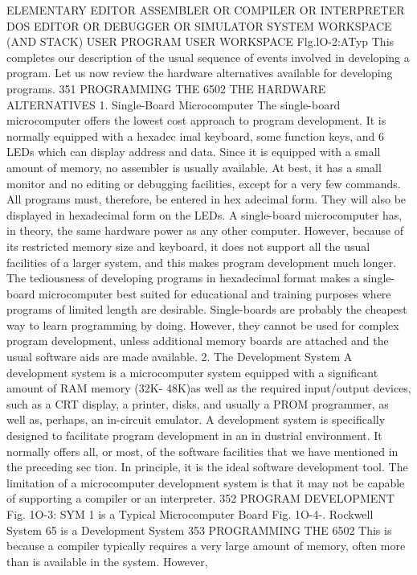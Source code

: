 \documentclass{book}
\begin{document}
{{{{{{{{{{{{{{{{{{{{{{{{{{{{{{{{{{{{{{{{{{{{{{{{{{{{{{{{{{{{{{{{{{{{{{{{{{{{{{{{{{{{{{{{{{{{{{{{{{{{{{{{{{{{{{{{{{{{{{{{{{{{{{{{{{{{{{{{{{{{ELEMENTARY
EDITOR
ASSEMBLER
OR
COMPILER
OR
INTERPRETER
DOS
EDITOR
OR
DEBUGGER
OR
SIMULATOR
SYSTEM
WORKSPACE
(AND STACK)
USER
PROGRAM
USER
WORKSPACE
Flg.lO-2:ATyp
This completes our description of the usual sequence of
events involved in developing a program. Let us now review the
hardware alternatives available for developing programs.
351
PROGRAMMING THE 6502
THE HARDWARE ALTERNATIVES
1. Single-Board Microcomputer
The single-board microcomputer offers the lowest cost approach
to program development. It is normally equipped with a hexadec
imal keyboard, some function keys, and 6 LEDs which can display
address and data. Since it is equipped with a small amount of
memory, no assembler is usually available. At best, it has a small
monitor and no editing or debugging facilities, except for a very
few commands. All programs must, therefore, be entered in hex
adecimal form. They will also be displayed in hexadecimal form on
the LEDs. A single-board microcomputer has, in theory, the
same hardware power as any other computer. However, because
of its restricted memory size and keyboard, it does not support all
the usual facilities of a larger system, and this makes program
development much longer. The tediousness of developing programs
in hexadecimal format makes a single-board microcomputer
best suited for educational and training purposes where programs
of limited length are desirable. Single-boards are probably the
cheapest way to learn programming by doing. However, they
cannot be used for complex program development, unless additional
memory boards are attached and the usual software aids are made
available.
2. The Development System
A development system is a microcomputer system equipped
with a significant amount of RAM memory (32K- 48K)as well as
the required input/output devices, such as a CRT display, a
printer, disks, and usually a PROM programmer, as well as,
perhaps, an in-circuit emulator. A development system is
specifically designed to facilitate program development in an in
dustrial environment. It normally offers all, or most, of the
software facilities that we have mentioned in the preceding sec
tion. In principle, it is the ideal software development tool.
The limitation of a microcomputer development system is that
it may not be capable of supporting a compiler or an interpreter.
352
PROGRAM DEVELOPMENT
Fig. 1O-3: SYM 1 is a Typical Microcomputer Board
Fig. 1O-4-. Rockwell System 65 is a Development System
353
PROGRAMMING THE 6502
This is because a compiler typically requires a very large amount
of memory, often more than is available in the system. However,
}}}}}}}}}}}}}}}}}}}}}}}}}}}}}}}}}}}}}}}}}}}}}}}}}}}}}}}}}}}}}}}}}}}}}}}}}}}}}}}}}}}}}}}}}}}}}}}}}}}}}}}}}}}}}}}}}}}}}}}}}}}}}}}}}}}}}}}}}}}}
\end{document}

